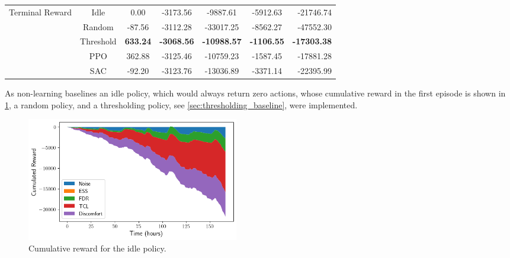 \begin{table}[t]
\begin{center}
\begin{small}
\begin{sc}
\begin{tabular}{lcccccr}
\midrule
\multirow{4}{*}{Terminal Reward} 
    & Idle      & 0.00   & -3173.56 & -9887.61  & -5912.63  & -21746.74 \\
    & Random    & -87.56 & -3112.28 & -33017.25 & -8562.27  & -47552.30 \\
    & Threshold & \textbf{633.24} & \textbf{-3068.56} & \textbf{-10988.57} & \textbf{-1106.55}  & \textbf{-17303.38} \\
    & PPO       & 362.88 & -3125.46 & -10759.23 & -1587.45  & -17881.28 \\
    & SAC       & -92.20  & -3123.76 & -13036.89 & -3371.14  & -22395.99 \\
\bottomrule
\end{tabular}
\end{sc}
\end{small}
\end{center}
\vskip -0.1in
\end{table}

As non-learning baselines an idle policy, which would always return zero actions, whose cumulative reward in the first episode is shown in \cref{fig:reward_idle}, a random policy, and a thresholding policy, see \cref{sec:thresholding_baseline}, were implemented.

\begin{figure}[H]
    \centering
    \includegraphics[width=0.45\textwidth]{figures/idle_reward.png}
    \caption{Cumulative reward for the idle policy.}
    \label{fig:reward_idle}
\end{figure}


